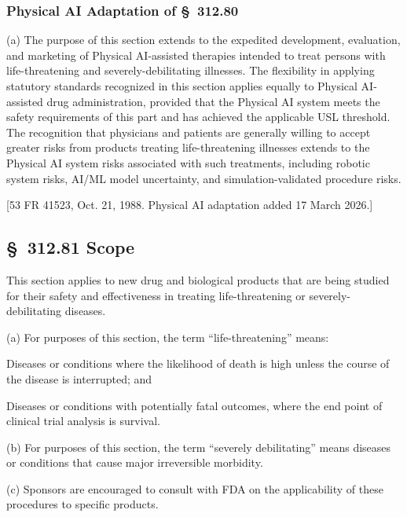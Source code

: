 \documentclass[11pt]{article}
\begin{document}
\subsubsection{Physical AI Adaptation of \S~312.80}

(a) The purpose of this section extends to the expedited development, evaluation, and marketing of Physical AI-assisted therapies intended to treat persons with life-threatening and severely-debilitating illnesses. The flexibility in applying statutory standards recognized in this section applies equally to Physical AI-assisted drug administration, provided that the Physical AI system meets the safety requirements of this part and has achieved the applicable USL threshold. The recognition that physicians and patients are generally willing to accept greater risks from products treating life-threatening illnesses extends to the Physical AI system risks associated with such treatments, including robotic system risks, AI/ML model uncertainty, and simulation-validated procedure risks.

[53 FR 41523, Oct. 21, 1988. Physical AI adaptation added 17 March 2026.]

\subsection{\S~312.81 Scope}

This section applies to new drug and biological products that are being studied for their safety and effectiveness in treating life-threatening or severely-debilitating diseases.

(a) For purposes of this section, the term ``life-threatening'' means:

\begin{description}[leftmargin=0.5cm,style=sameline]
\item[(1)] Diseases or conditions where the likelihood of death is high unless the course of the disease is interrupted; and
\item[(2)] Diseases or conditions with potentially fatal outcomes, where the end point of clinical trial analysis is survival.
\end{description}

(b) For purposes of this section, the term ``severely debilitating'' means diseases or conditions that cause major irreversible morbidity.

(c) Sponsors are encouraged to consult with FDA on the applicability of these procedures to specific products.
\end{document}
